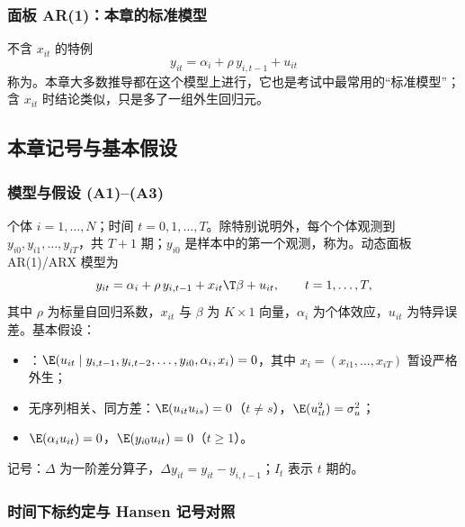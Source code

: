 \subsubsection{面板 AR(1)：本章的标准模型}

不含 $x_{it}$ 的特例
\[
y_{it}=\alpha_i+\rho\,y_{i,t-1}+u_{it}
\]
称为。本章大多数推导都在这个模型上进行，它也是考试中最常用的“标准模型”；含 $x_{it}$ 时结论类似，只是多了一组外生回归元。

\subsection{本章记号与基本假设}

\subsubsection{模型与假设 (A1)–(A3)}

\begin{defn}[本章记号与基本假设]\label{def:U12a-setup}
个体 $i=1,\dots,N$；时间 $t=0,1,\dots,T$。除特别说明外，每个个体观测到 $y_{i0},y_{i1},\dots,y_{iT}$，共 $T+1$ 期；$y_{i0}$ 是样本中的第一个观测，称为。动态面板 AR(1)/ARX 模型为
\begin{equation}\label{eq:U12a-model}
y_{it}=\alpha_i+\rho\,y_{i,t-1}+x_{it}\T\beta+u_{it},\qquad t=1,\dots,T,
\end{equation}
其中 $\rho$ 为标量自回归系数，$x_{it}$ 与 $\beta$ 为 $K\times1$ 向量，$\alpha_i$ 为个体效应，$u_{it}$ 为特异误差。基本假设：
\begin{itemize}[leftmargin=3em,labelsep=0.5em]
  \item[(A1)] ：$\E(u_{it}\mid y_{i,t-1},y_{i,t-2},\dots,y_{i0},\alpha_i,x_i)=0$，其中 $x_i=(x_{i1},\dots,x_{iT})$ 暂设严格外生；
  \item[(A2)] 无序列相关、同方差：$\E(u_{it}u_{is})=0$（$t\neq s$），$\E(u_{it}^2)=\sigma_u^2$；
  \item[(A3)] $\E(\alpha_iu_{it})=0$，$\E(y_{i0}u_{it})=0$（$t\ge1$）。
\end{itemize}
记号：$\Delta$ 为一阶差分算子，$\Delta y_{it}=y_{it}-y_{i,t-1}$；$I_t$ 表示 $t$ 期的。
\end{defn}

\subsubsection{时间下标约定与 Hansen 记号对照}

